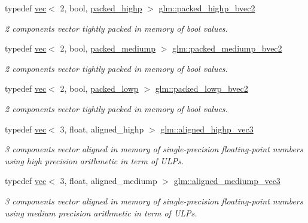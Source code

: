 \begin{DoxyCompactItemize}
typedef \hyperlink{structglm_1_1vec}{vec}$<$ 2, bool, \hyperlink{namespaceglm_a36ed105b07c7746804d7fdc7cc90ff25a8e8791ee77fe079b1291f710d88031bf}{packed\+\_\+highp} $>$ \hyperlink{group__gtc__type__aligned_ga8059c50785881a9f30b9a8e3ff5daf83}{glm\+::packed\+\_\+highp\+\_\+bvec2}
\begin{DoxyCompactList}\small\item\em 2 components vector tightly packed in memory of bool values. \end{DoxyCompactList}\item 
typedef \hyperlink{structglm_1_1vec}{vec}$<$ 2, bool, \hyperlink{namespaceglm_a36ed105b07c7746804d7fdc7cc90ff25a9604654c3b137cd7898689fd34b25bc0}{packed\+\_\+mediump} $>$ \hyperlink{group__gtc__type__aligned_ga5c9715603d1138006760556f02aacad5}{glm\+::packed\+\_\+mediump\+\_\+bvec2}
\begin{DoxyCompactList}\small\item\em 2 components vector tightly packed in memory of bool values. \end{DoxyCompactList}\item 
typedef \hyperlink{structglm_1_1vec}{vec}$<$ 2, bool, \hyperlink{namespaceglm_a36ed105b07c7746804d7fdc7cc90ff25ac36a4bd74559be2c0b65bc48e5953b8b}{packed\+\_\+lowp} $>$ \hyperlink{group__gtc__type__aligned_gac3a7ad6d846a92b3e5d708cbb51b1f24}{glm\+::packed\+\_\+lowp\+\_\+bvec2}
\begin{DoxyCompactList}\small\item\em 2 components vector tightly packed in memory of bool values. \end{DoxyCompactList}\item 
typedef \hyperlink{structglm_1_1vec}{vec}$<$ 3, float, aligned\+\_\+highp $>$ \hyperlink{group__gtc__type__aligned_ga9ddb18aa4936b5aa354fcefe179675af}{glm\+::aligned\+\_\+highp\+\_\+vec3}
\begin{DoxyCompactList}\small\item\em 3 components vector aligned in memory of single-\/precision floating-\/point numbers using high precision arithmetic in term of U\+L\+Ps. \end{DoxyCompactList}\item 
typedef \hyperlink{structglm_1_1vec}{vec}$<$ 3, float, aligned\+\_\+mediump $>$ \hyperlink{group__gtc__type__aligned_ga1c5c37a497fa004afa060bd173b20447}{glm\+::aligned\+\_\+mediump\+\_\+vec3}
\begin{DoxyCompactList}\small\item\em 3 components vector aligned in memory of single-\/precision floating-\/point numbers using medium precision arithmetic in term of U\+L\+Ps. \end{DoxyCompactList}\item 

\end{DoxyCompactItemize}
